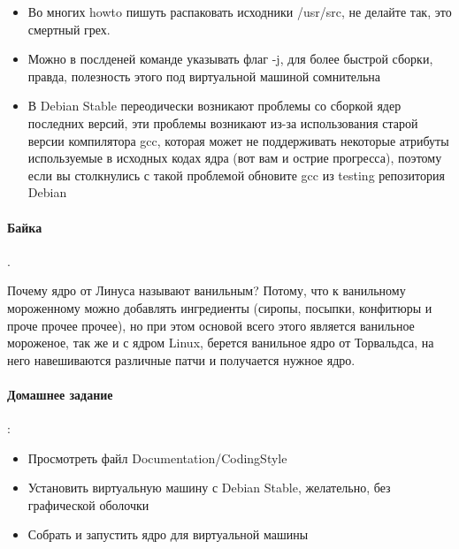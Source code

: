 \begin{itemize}
\item Во многих howto пишуть распаковать исходники /usr/src, не делайте так, это смертный грех.

\item Можно в послденей команде указывать флаг -j, для более быстрой сборки, правда, полезность этого под виртуальной машиной сомнительна

\item В Debian Stable переодически возникают проблемы со сборкой ядер последних версий, эти проблемы возникают из-за использования старой версии
компилятора gcc, которая может не поддерживать некоторые атрибуты используемые в исходных кодах ядра (вот вам и острие прогресса), поэтому если вы столкнулись
с такой проблемой обновите gcc из testing репозитория Debian 
\end{itemize}

\paragraph{Байка}.

Почему ядро от Линуса называют ванильным? Потому, что к ванильному мороженному можно добавлять ингредиенты (сиропы, посыпки,
конфитюры и проче прочее прочее), но при этом основой всего этого является ванильное мороженое, так же и с ядром Linux, берется
ванильное ядро от Торвальдса, на него навешиваются различные патчи и получается нужное ядро.

\paragraph{Домашнее задание}:

\begin{itemize}
\item Просмотреть файл Documentation/CodingStyle

\item Установить виртуальную машину с Debian Stable, желательно, без графической оболочки

\item Собрать и запустить ядро для виртуальной машины
\end{itemize}